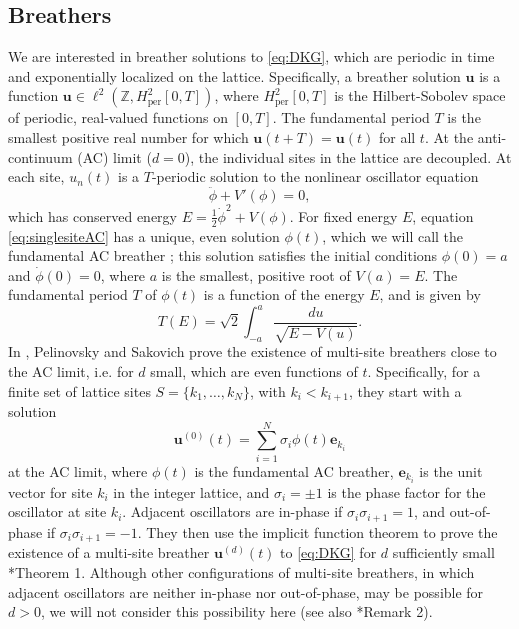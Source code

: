 \documentclass[12pt,reqno]{amsart}
\def\Z{{\mathbb Z}}
\def\per{\textrm{per}}
\newcommand{\evec}{\mathbf{e}}
\newcommand{\uvec}{\mathbf{u}}
\theoremstyle{definition}
\begin{document}
\subsection{Breathers}\label{sec:DKGbreather}

We are interested in breather solutions to \cref{eq:DKG}, which are periodic in time and exponentially localized on the lattice. Specifically, a breather solution $\uvec$ is a function $\uvec \in \ell^2(\Z, H^2_\per[0,T])$, where $H^2_\per[0,T]$ is the Hilbert-Sobolev space of periodic, real-valued functions on $[0,T]$. 
The fundamental period $T$ is the smallest positive real number for which $\uvec(t+T) = \uvec(t)$ for all $t$. At the anti-continuum (AC) limit ($d = 0$), the individual sites in the lattice are decoupled. At each site, $u_n(t)$ is a $T$-periodic solution to the nonlinear oscillator equation
\begin{equation}\label{eq:singlesiteAC}
\ddot{\phi} + V'(\phi) = 0,
\end{equation}
which has conserved energy $E = \frac{1}{2}\dot{\phi}^2 + V(\phi)$. For fixed energy $E$, equation \cref{eq:singlesiteAC} has a unique, even solution $\phi(t)$, which we will call the fundamental AC breather \cite{Pelinovsky2012}; this solution satisfies the initial conditions $\phi(0) = a$ and $\dot{\phi}(0) = 0$, where $a$ is the smallest, positive root of $V(a) = E$. The fundamental period $T$ of $\phi(t)$ is a function of the energy $E$, and is given by
\begin{equation}\label{eq:TE}
T(E) = \sqrt{2}\int_{-a}^a \frac{du}{\sqrt{E - V(u)}}.
\end{equation}
In \cite{Pelinovsky2012}, Pelinovsky and Sakovich prove the existence of multi-site breathers close to the AC limit, i.e. for $d$ small, which are even functions of $t$. Specifically, for a finite set of lattice sites $S = \{ k_1, \dots, k_N \}$, with $k_i < k_{i+1}$, they start with a solution
\begin{equation}
\uvec^{(0)}(t) = \sum_{i=1}^N \sigma_i \phi(t) \evec_{k_i}
\end{equation}
at the AC limit, where $\phi(t)$ is the fundamental AC breather, $\evec_{k_i}$ is the unit vector for site $k_i$ in the integer lattice, and $\sigma_i = \pm 1$ is the phase factor for the oscillator at site $k_i$. Adjacent oscillators are in-phase if $\sigma_i \sigma_{i+1} = 1$, and out-of-phase if $\sigma_i \sigma_{i+1} = -1$. They then use the implicit function theorem to prove the existence of a multi-site breather $\uvec^{(d)}(t)$ to \cref{eq:DKG} for $d$ sufficiently small \cite{Pelinovsky2012}*{Theorem 1}. Although other configurations of multi-site breathers, in which adjacent oscillators are neither in-phase nor out-of-phase, may be possible for $d > 0$, we will not consider this possibility here (see also \cite{Pelinovsky2012}*{Remark 2}).
\end{document}
